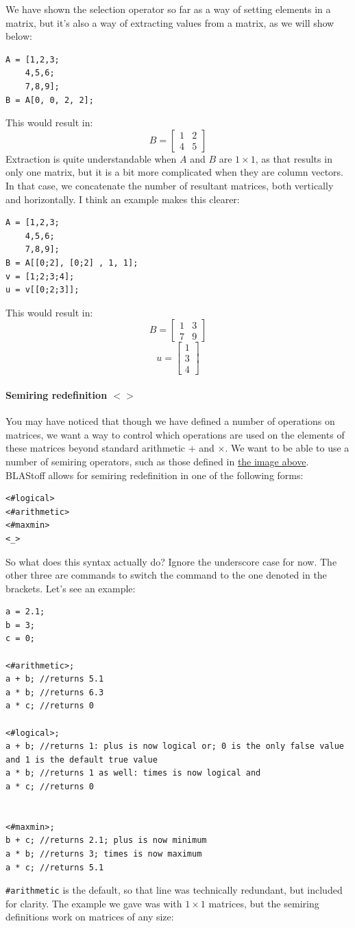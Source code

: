 We have shown the selection operator so far as a way of setting elements in a matrix, but it's also a way of extracting values from a matrix, as we will show below:
\begin{lstlisting}
A = [1,2,3;
    4,5,6;
    7,8,9];
B = A[0, 0, 2, 2];
\end{lstlisting}
This would result in:
$$B=\begin{bmatrix}1 & 2\\4 &5 \end{bmatrix}$$
Extraction is quite understandable when $A$ and $B$ are $1\times 1$, as that results in only one matrix, but it is a bit more complicated when they are column vectors.  In that case, we concatenate the number of resultant matrices, both vertically and horizontally.  I think an example makes this clearer:
\begin{lstlisting}
A = [1,2,3;
    4,5,6;
    7,8,9];
B = A[[0;2], [0;2] , 1, 1];
v = [1;2;3;4];
u = v[[0;2;3]];
\end{lstlisting}
This would result in:
$$B=\begin{bmatrix}1 & 3\\7 &9 \end{bmatrix}$$
$$u=\begin{bmatrix}1\\3\\4\end{bmatrix}$$


\paragraph{Semiring redefinition \texorpdfstring{$<>$}{<>}}
You may have noticed that though we have defined a number of operations on matrices, we want a way to control which operations are used on the elements of these matrices beyond standard arithmetic $+$ and $\times$.  We want to be able to use a number of semiring operators, such as those defined in \hyperref[sec:semirings]{the image above}.  BLAStoff allows for semiring redefinition in one of the following forms:
\begin{lstlisting}
<#logical>
<#arithmetic>
<#maxmin>
<_>
\end{lstlisting}
So what does this syntax actually do?  Ignore the underscore case for now.  The other three are commands to switch the command to the one denoted in the brackets.  Let's see an example:

\begin{lstlisting}
a = 2.1;
b = 3;
c = 0;

<#arithmetic>;
a + b; //returns 5.1
a * b; //returns 6.3
a * c; //returns 0

<#logical>;
a + b; //returns 1: plus is now logical or; 0 is the only false value and 1 is the default true value
a * b; //returns 1 as well: times is now logical and
a * c; //returns 0


<#maxmin>;
b + c; //returns 2.1; plus is now minimum
a * b; //returns 3; times is now maximum
a * c; //returns 5.1
\end{lstlisting}
\verb=#arithmetic= is the default, so that line was technically redundant, but included for clarity.
The example we gave was with $1\times1$ matrices, but the semiring definitions work on matrices of any size:

